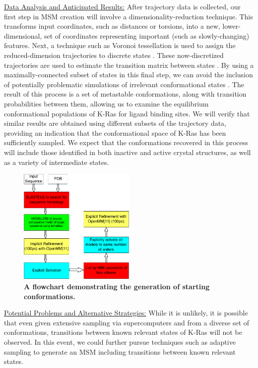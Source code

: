 \documentclass[12pt]{article}
\begin{document}
 \underline{Data Analysis and Anticipated Results:} After trajectory data is collected, our first step in MSM creation will involve a dimensionality-reduction technique. This transforms input coordinates, such as distances or torsions, into a new, lower-dimensional, set of coordinates representing important (such as slowly-changing) features. Next, a technique such as Voronoi tessellation is used to assign the reduced-dimension trajectories to discrete states \cite{chodera2014}. These now-discretized trajectories are used to estimate the transition matrix between states \cite{chodera2014}. By using a maximally-connected subset of states in this final step, we can avoid the inclusion of potentially problematic simulations of irrelevant conformational states \cite{kyle}. The result of this process is a set of metastable conformations, along with transition probabilities between them, allowing us to examine the equilibrium conformational populations of K-Ras for ligand binding sites. We will verify that similar results are obtained using different subsets of the trajectory data, providing an indication that the conformational space of K-Ras has been sufficiently sampled. We expect that the conformations recovered in this process will include those identified in both inactive and active crystal structures, as well as a variety of intermediate states.



  \begin{figure}[H]
    \centering
    \includegraphics[width=0.5\textwidth]{msmseedernew_cite.png}
  \caption{\textbf{A flowchart demonstrating the generation of starting conformations.}}
  \label{msmseeder}
  \end{figure}
  
\underline{Potential Problems and Alternative Strategies:} While it is unlikely, it is possible that even given extensive sampling via supercomputers and from a diverse set of conformations, transitions between known relevant states of K-Ras will not be observed. In this event, we could further pursue techniques such as adaptive sampling \cite{chodera2014} to generate an MSM including transitions between known relevant states.
  
\end{document}
